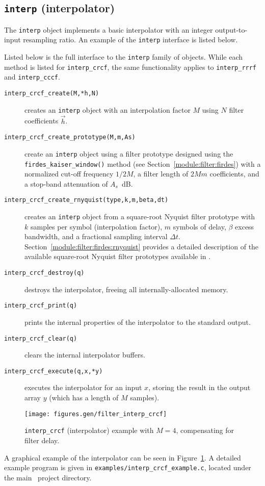 % 
%
\subsection{{\tt interp} (interpolator)}
\label{module:filter:interp}
The {\tt interp} object implements a basic interpolator with an integer
output-to-input resampling ratio.
An example of the {\tt interp} interface is listed below.
%

%
Listed below is the full interface to the {\tt interp} family of
objects.
While each method is listed for {\tt interp\_crcf}, the same
functionality applies to {\tt interp\_rrrf} and {\tt interp\_cccf}.
%
\begin{description}
\item[{\tt interp\_crcf\_create(M,*h,N)}]
    creates an {\tt interp} object with an interpolation factor $M$
    using $N$ filter coefficients $\vec{h}$.
\item[{\tt interp\_crcf\_create\_prototype(M,m,As)}]
    create an {\tt interp} object using a filter prototype designed
    using the {\tt firdes\_kaiser\_window()} method
    (see Section~\ref{module:filter:firdes})
    with a normalized cut-off frequency $1/2M$,
    a filter length of $2Mm$ coefficients,
    and a stop-band attenuation of $A_s$~dB.
\item[{\tt interp\_crcf\_create\_rnyquist(type,k,m,beta,dt)}]
    creates an {\tt interp} object
    from a square-root Nyquist filter prototype with
    $k$ samples per symbol (interpolation factor),
    $m$ symbols of delay,
    $\beta$ excess bandwidth,
    and a fractional sampling interval $\Delta t$.
    Section~\ref{module:filter:firdes:rnyquist}
    provides a detailed description of the available square-root Nyquist
    filter prototypes available in \liquid.
\item[{\tt interp\_crcf\_destroy(q)}]
    destroys the interpolator, freeing all internally-allocated memory.
\item[{\tt interp\_crcf\_print(q)}]
    prints the internal properties of the interpolator to the standard
    output.
\item[{\tt interp\_crcf\_clear(q)}]
    clears the internal interpolator buffers.
\item[{\tt interp\_crcf\_execute(q,x,*y)}]
    executes the interpolator for an input $x$, storing the result in
    the output array $y$ (which has a length of $M$ samples).
\end{description}
%
\begin{figure}
\centering
  \texttt{[image: figures.gen/filter\_interp\_crcf]}
\caption{{\tt interp\_crcf} (interpolator) example with $M=4$,
         compensating for filter delay.}
\label{fig:module:filter:interp_crcf}
\end{figure}
%
A graphical example of the interpolator can be seen in
Figure~\ref{fig:module:filter:interp_crcf}.
A detailed example program is given in
{\tt examples/interp\_crcf\_example.c},
located under the main \liquid\ project directory.


